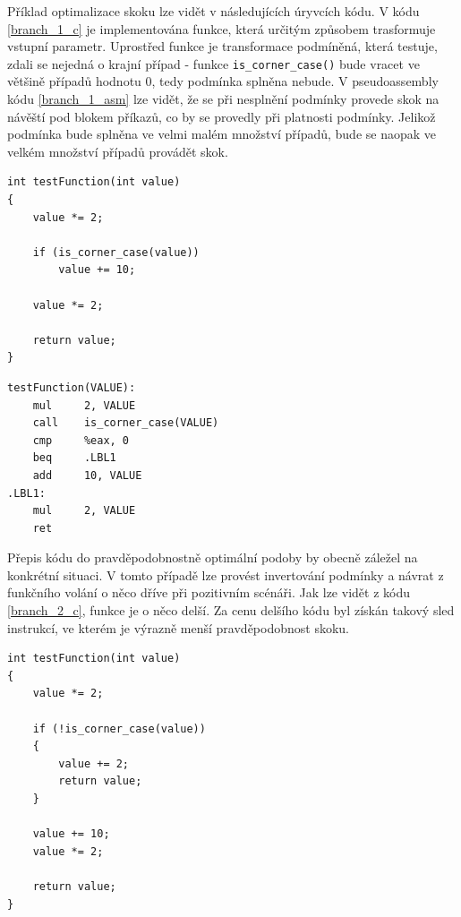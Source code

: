 \documentclass[czech,BP]{thesiskiv}
\begin{document}
Příklad optimalizace skoku lze vidět v následujících úryvcích kódu. V kódu \ref{branch_1_c} je implementována funkce, která určitým způsobem trasformuje vstupní parametr. Uprostřed funkce je transformace podmíněná, která testuje, zdali se nejedná o krajní případ - funkce \texttt{is\_corner\_case()} bude vracet ve většině případů hodnotu $0$, tedy podmínka splněna nebude. V pseudoassembly kódu \ref{branch_1_asm} lze vidět, že se při nesplnění podmínky provede skok na návěští pod blokem příkazů, co by se provedly při platnosti podmínky. Jelikož podmínka bude splněna ve velmi malém množství případů, bude se naopak ve velkém množství případů provádět skok.

\lstset{escapechar=@,style=customc}
\begin{lstlisting}[caption=Funkce v jazyce C znázorňující nutnost skoku při splněné podmínce, label=branch_1_c]
int testFunction(int value)
{
    value *= 2;
  
    if (is_corner_case(value))
        value += 10;
  
    value *= 2;
  
    return value;
}
\end{lstlisting}

\lstset{escapechar=@,style=customasm}
\begin{lstlisting}[caption=Pseudoassembly verze kódu \ref{branch_1_c}, label=branch_1_asm]
testFunction(VALUE):
    mul     2, VALUE
    call    is_corner_case(VALUE)
    cmp     %eax, 0
    beq     .LBL1
    add     10, VALUE
.LBL1:
    mul     2, VALUE
    ret
\end{lstlisting}

Přepis kódu do pravděpodobnostně optimální podoby by obecně záležel na konkrétní situaci. V tomto případě lze provést invertování podmínky a návrat z funkčního volání o něco dříve při pozitivním scénáři. Jak lze vidět z kódu \ref{branch_2_c}, funkce je o něco delší. Za cenu delšího kódu byl získán takový sled instrukcí, ve kterém je výrazně menší pravděpodobnost skoku.
\\

\lstset{escapechar=@,style=customc}
\begin{lstlisting}[caption=Funkce v jazyce C znázorňující nutnost skoku při splněné podmínce, label=branch_2_c]
int testFunction(int value)
{
    value *= 2;
  
    if (!is_corner_case(value))
    {
        value += 2;
        return value;
    }

    value += 10;
    value *= 2;

    return value;
}
\end{lstlisting}
\end{document}
